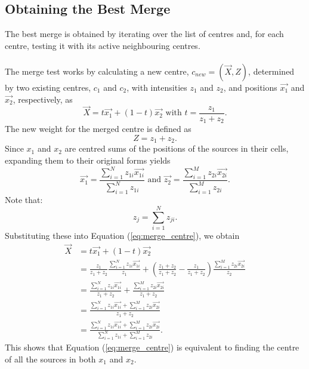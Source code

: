 \subsection{Obtaining the Best Merge}
The best merge is obtained by iterating over the list of centres and, for each centre, testing it with its active neighbouring centres.
\\
\\
The merge test works by calculating a new centre, $c_{new} = (\vec{X},Z)$, determined by two existing centres, $c_1$ and $c_2$, with intensities $z_1$ and $z_2$, and positions $\vec{x_1}$ and $\vec{x_2}$, respectively, as
\begin{equation} \label{eq:merge_centre}
	\vec{X} = t\vec{x_1} + (1-t)\vec{x_2} \text{  with  } t = \frac{z_1}{z_1 + z_2}.
\end{equation}
The new weight for the merged centre is defined as
\begin{equation}
	Z = z_1 + z_2.
\end{equation}
Since $x_1$ and $x_2$ are centred sums of the positions of the sources in their cells, expanding them to their original forms yields
\begin{equation*}
\vec{x_1} = \frac{\sum^N_{i=1} z_{1i}\vec{x_{1i}}}{\sum^N_{i=1}z_{1i}} \text{  and  } \vec{z_2} = \frac{\sum^M_{i=1} z_{2i}\vec{x_{2i}}}{\sum^M_{i=1}z_{2i}}.
\end{equation*}
Note that:
\begin{equation*}
	z_j = \sum^N_{i=1}z_{ji}.
\end{equation*}
Substituting these into Equation (\ref{eq:merge_centre}), we obtain
\begin{align*}
	\vec{X}	&= t\vec{x_1} + (1-t)\vec{x_2} \\
		&= \frac{z_1}{z_1 + z_2}\frac{\sum^N_{i=1} z_{1i}\vec{x_{1i}}}{z_1} + (\frac{z_1 + z_2}{z_1 + z_2} - \frac{z_1}{z_1 + z_2})\frac{\sum^M_{i=1} z_{2i}\vec{x_{2i}}}{z_2} \\
		&= \frac{\sum^N_{i=1} z_{1i}\vec{x_{1i}}}{z_1 + z_2} + \frac{\sum^M_{i=1} z_{2i}\vec{x_{2i}}}{z_1 + z_2} \\
		&= \frac{\sum^N_{i=1} z_{1i}\vec{x_{1i}} + \sum^M_{i=1} z_{2i}\vec{x_{2i}}}{z_1 + z_2} \\
		&= \frac{\sum^N_{i=1} z_{1i}\vec{x_{1i}} + \sum^M_{i=1} z_{2i}\vec{x_{2i}}}{\sum^N_{i=1}z_{1i} + \sum^M_{i=1}z_{2i}}.
\end{align*}
This shows that Equation (\ref{eq:merge_centre}) is equivalent to finding the centre of all the sources in both $x_1$ and $x_2$.
\\
